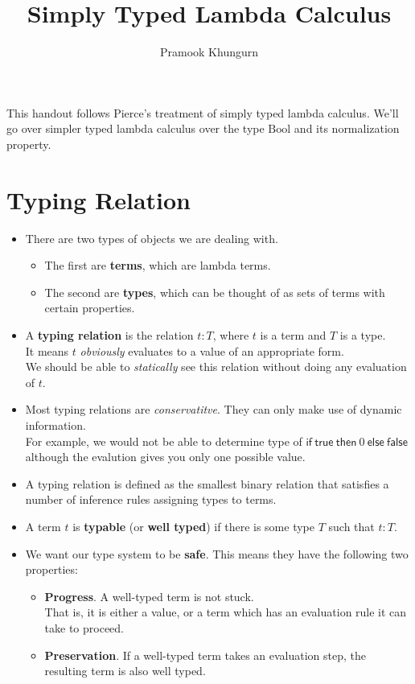 \documentclass[10pt]{article}
\title{Simply Typed Lambda Calculus}
\author{Pramook Khungurn}
\newcommand{\mrm}[1]{\mathrm{#1}}
\newcommand{\msf}[1]{\mathsf{#1}}
\begin{document}
	\maketitle
	
	This handout follows Pierce's treatment of simply typed lambda calculus. We'll go over simpler typed lambda calculus
	over the type $\mrm{Bool}$ and its normalization property.
  
	\section{Typing Relation}
	
	\begin{itemize}
	  \item There are two types of objects we are dealing with.
	  \begin{itemize}
	    \item The first are {\bf terms}, which are lambda terms.
	    \item The second are {\bf types}, which can be thought of as sets of terms with certain properties.
	  \end{itemize}
	  
	  \item A {\bf typing relation} is the relation $t : T$, where $t$ is a term and $T$ is a type.\\
	  It means $t$ \emph{obviously} evaluates to a value of an appropriate form.\\	
	  We should be able to \emph{statically} see this relation without doing any evaluation of $t$.
	  
	  \item Most typing relations are \emph{conservatitve}. They can only make use of dynamic information.\\
	  For example, we would not be able to determine type of $\msf{if}\ \msf{true}\ \msf{then}\ 0\ \msf{else}\ \msf{false}$
	  although the evalution gives you only one possible value.
	  
	  \item A typing relation is defined as the smallest binary relation that satisfies a number 
	    of inference rules assigning types to terms.
	  
	  \item A term $t$ is {\bf typable}	(or {\bf well typed}) if there is some type $T$ such that $t : T$.
	  
	  \item We want our type system to be {\bf safe}. This means they have the following two properties:
	    \begin{itemize}
	      \item {\bf Progress}. A well-typed term is not stuck.\\
	      That is, it is either a value, or a term which has an evaluation rule it can take to proceed.
	      \item {\bf  Preservation}. If a well-typed term takes an evaluation step, the resulting term
	      is also well typed.
	    \end{itemize}	    
	\end{itemize}
	
\end{document}
